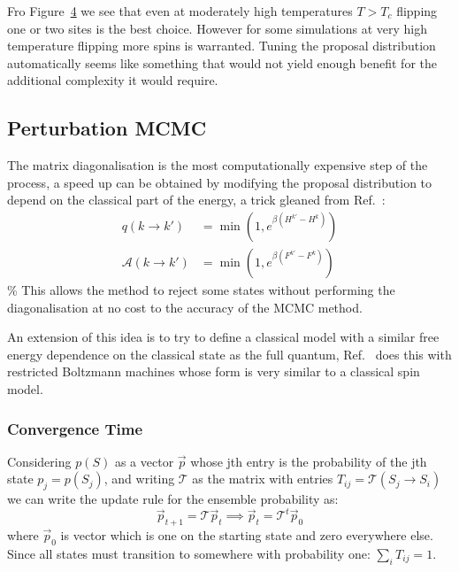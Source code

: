 Fro Figure~\protect\hyperlink{fig:comparison}{4} we see that even at moderately high temperatures \(T > T_c\) flipping one or two sites is the best choice. However for some simulations at very high temperature flipping more spins is warranted. Tuning the proposal distribution automatically seems like something that would not yield enough benefit for the additional complexity it would require.

\hypertarget{perturbation-mcmc}{%
\subsection{Perturbation MCMC}\label{perturbation-mcmc}}

The matrix diagonalisation is the most computationally expensive step of the process, a speed up can be obtained by modifying the proposal distribution to depend on the classical part of the energy, a trick gleaned from Ref.~\autocite{krauthIntroductionMonteCarlo1998}: \[
\begin{aligned}
q(k \to k') &= \min\left(1, e^{\beta (H^{k'} - H^k)}\right) \\
\mathcal{A}(k \to k') &= \min\left(1, e^{\beta(F^{k'}- F^k)}\right)
\end{aligned}\] \% This allows the method to reject some states without performing the diagonalisation at no cost to the accuracy of the MCMC method.

An extension of this idea is to try to define a classical model with a similar free energy dependence on the classical state as the full quantum, Ref.~\autocite{huangAcceleratedMonteCarlo2017} does this with restricted Boltzmann machines whose form is very similar to a classical spin model.

\hypertarget{app-mcmc-convergence}{%
\subsubsection{Convergence Time}\label{app-mcmc-convergence}}

Considering \(p(S)\) as a vector \(\vec{p}\) whose jth entry is the probability of the jth state \(p_j = p(S_j)\), and writing \(\mathcal{T}\) as the matrix with entries \(T_{ij} = \mathcal{T}(S_j \rightarrow S_i)\) we can write the update rule for the ensemble probability as: \[\vec{p}_{t+1} = \mathcal{T} \vec{p}_t \implies \vec{p}_{t} = \mathcal{T}^t \vec{p}_0\] where \(\vec{p}_0\) is vector which is one on the starting state and zero everywhere else. Since all states must transition to somewhere with probability one: \(\sum_i T_{ij} = 1\).

